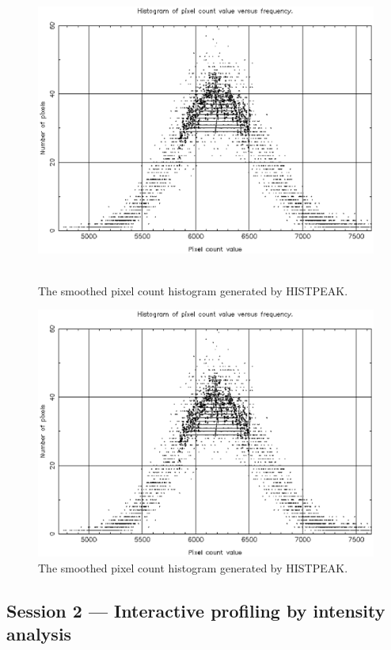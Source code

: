 \documentclass[twoside,11pt]{article}
\newenvironment{latexonly}{}{}
\newcommand{\xlabel}[1]{}
\begin{document}
\begin{latexonly}
\begin{figure}[htlb]
\centering 
\includegraphics[height=100mm,width=150mm]{sun180_diag2.eps}
\caption{The smoothed pixel count histogram generated by HISTPEAK.}
\end{figure}
\end{latexonly}
\begin{htmlonly}
\begin{figure}[htlb]
\centering 
\includegraphics{sun180_diag2.eps}
\caption{The smoothed pixel count histogram generated by HISTPEAK.}
\end{figure}
\end{htmlonly}

\subsection{Session 2 --- Interactive profiling by intensity analysis}
\xlabel{SESSION2}
\end{document}
